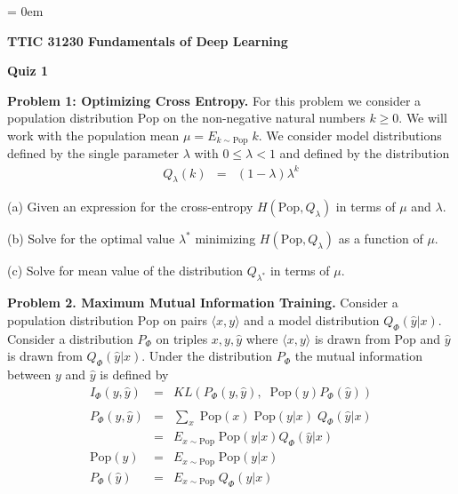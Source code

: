 

%

\usepackage{amsmath,amssymb,amsthm,graphicx,color}
\newcommand{\pop}{\mathrm{Pop}}
\newcommand{\train}{\mathrm{Train}}
\DeclareMathOperator*{\argmin}{argmin}
\DeclareMathOperator*{\argmax}{argmax}
\newcommand{\tuple}[1]{{\mbox{$\langle#1\rangle$}}}

\parindent = 0em

\newcommand{\solution}[1]{\bigskip {\color{red} {\bf Solution}: #1}}




\centerline{\bf TTIC 31230 Fundamentals of Deep Learning}
\centerline{\bf Quiz 1}

\vfill
\vfill
    {\bf Problem 1: Optimizing Cross Entropy.} For this problem we consider a population distribution $\pop$ on the non-negative natural numbers $k \geq 0$.
    We will work with the population mean $\mu = E_{k \sim \pop} \;k$.
We consider model distributions defined by the single parameter $\lambda$ with $0 \leq \lambda < 1$ and defined by the distribution
\begin{eqnarray*}
  Q_\lambda(k) & = & (1-\lambda)\lambda^k
\end{eqnarray*}

\medskip
(a) Given an expression for the cross-entropy $H(\pop,Q_\lambda)$ in terms of $\mu$ and $\lambda$.

\medskip
(b) Solve for the optimal value $\lambda^*$ minimizing $H(\pop,Q_\lambda)$ as a function of $\mu$.

\medskip
(c) Solve for mean value of the distribution $Q_{\lambda^*}$ in terms of $\mu$.

\bigskip
{\bf Problem 2. Maximum Mutual Information Training.} Consider a population distribution $\pop$ on pairs $\tuple{x,y}$ and a model distribution $Q_\Phi(\hat{y}|x)$.
Consider a distribution $P_\Phi$ on triples ${x,y,\hat{y}}$ where $\tuple{x,y}$ is drawn from $\pop$ and $\hat{y}$ is drawn from $Q_\Phi(\hat{y}|x)$.
Under the distribution $P_\Phi$ the mutual information between $y$ and $\hat{y}$ is defined by
\begin{eqnarray*}
  I_\Phi(y,\hat{y})& = & KL(P_\Phi(y,\hat{y}),\;\;\pop(y)P_\Phi(\hat{y})) \\
  \\
  P_\Phi(y,\hat{y}) & = & \sum_x\;\pop(x)\;\pop(y|x)\;Q_\Phi(\hat{y}|x) \\
  & = & E_{x \sim \pop}\;\pop(y|x)Q_\Phi(\hat{y}|x) \\
  \pop(y) & = & E_{x \sim \pop}\;\pop(y|x) \\
  P_\Phi(\hat{y}) & = & E_{x \sim \pop}\;Q_\Phi(y|x)
\end{eqnarray*}

